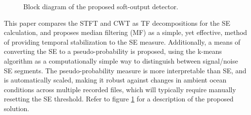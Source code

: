 \begin{figure}[h!]
	\centering
	\caption{Block diagram of the proposed soft-output detector.}\label{fig:systdiag}
\end{figure}

This paper compares the STFT and CWT as TF decompositions for the SE calculation, and proposes median filtering (MF) as a simple, yet effective, method of providing temporal stabilization to the SE measure. Additionally, a means of converting the SE to a pseudo-probability is proposed, using the k-means algorithm as a computationally simple way to distinguish between signal/noise SE segments. The pseudo-probability measure is more interpretable than SE, and is automatically scaled, making it robust against changes in ambient ocean conditions across multiple recorded files, which will typically require manually resetting the SE threshold.  Refer to figure \ref{fig:systdiag} for a description of the proposed solution.


